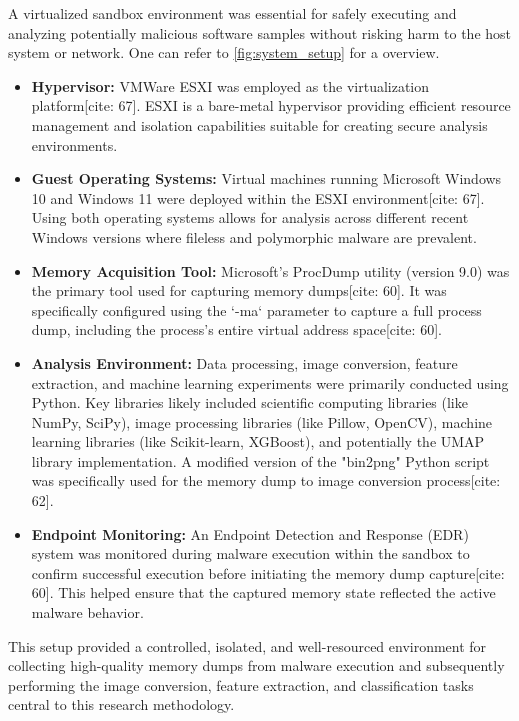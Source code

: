 A virtualized sandbox environment was essential for safely executing and analyzing potentially malicious software samples without risking harm to the host system or network. One can refer to \ref{fig:system_setup} for a overview.
\begin{itemize}
    \item \textbf{Hypervisor:} VMWare ESXI was employed as the virtualization platform[cite: 67]. ESXI is a bare-metal hypervisor providing efficient resource management and isolation capabilities suitable for creating secure analysis environments.
    \item \textbf{Guest Operating Systems:} Virtual machines running Microsoft Windows 10 and Windows 11 were deployed within the ESXI environment[cite: 67]. Using both operating systems allows for analysis across different recent Windows versions where fileless and polymorphic malware are prevalent.
    \item \textbf{Memory Acquisition Tool:} Microsoft's ProcDump utility (version 9.0) was the primary tool used for capturing memory dumps[cite: 60]. It was specifically configured using the `-ma` parameter to capture a full process dump, including the process's entire virtual address space[cite: 60].
    \item \textbf{Analysis Environment:} Data processing, image conversion, feature extraction, and machine learning experiments were primarily conducted using Python. Key libraries likely included scientific computing libraries (like NumPy, SciPy), image processing libraries (like Pillow, OpenCV), machine learning libraries (like Scikit-learn, XGBoost), and potentially the UMAP library implementation. A modified version of the "bin2png" Python script was specifically used for the memory dump to image conversion process[cite: 62].
    \item \textbf{Endpoint Monitoring:} An Endpoint Detection and Response (EDR) system was monitored during malware execution within the sandbox to confirm successful execution before initiating the memory dump capture[cite: 60]. This helped ensure that the captured memory state reflected the active malware behavior.
\end{itemize}

This setup provided a controlled, isolated, and well-resourced environment for collecting high-quality memory dumps from malware execution and subsequently performing the image conversion, feature extraction, and classification tasks central to this research methodology.

